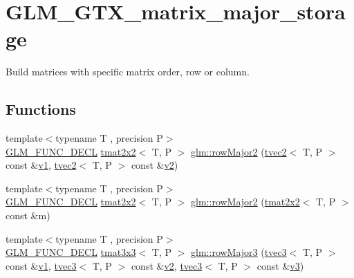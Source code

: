 \hypertarget{group__gtx__matrix__major__storage}{}\section{G\+L\+M\+\_\+\+G\+T\+X\+\_\+matrix\+\_\+major\+\_\+storage}
\label{group__gtx__matrix__major__storage}


Build matrices with specific matrix order, row or column.  


\subsection*{Functions}
\begin{DoxyCompactItemize}
\item 
{\footnotesize template$<$typename T , precision P$>$ }\\\mbox{\hyperlink{setup_8hpp_ab2d052de21a70539923e9bcbf6e83a51}{G\+L\+M\+\_\+\+F\+U\+N\+C\+\_\+\+D\+E\+CL}} \mbox{\hyperlink{structglm_1_1tmat2x2}{tmat2x2}}$<$ T, P $>$ \mbox{\hyperlink{group__gtx__matrix__major__storage_ga0c7f4d56a85865f0002127119ab7d551}{glm\+::row\+Major2}} (\mbox{\hyperlink{structglm_1_1tvec2}{tvec2}}$<$ T, P $>$ const \&\mbox{\hyperlink{glad_8h_a0779c3b73f9aa3a0ac5b0139b5d291d9}{v1}}, \mbox{\hyperlink{structglm_1_1tvec2}{tvec2}}$<$ T, P $>$ const \&\mbox{\hyperlink{glad_8h_a9a09a1837922b2b806f4589096a52049}{v2}})
\item 
{\footnotesize template$<$typename T , precision P$>$ }\\\mbox{\hyperlink{setup_8hpp_ab2d052de21a70539923e9bcbf6e83a51}{G\+L\+M\+\_\+\+F\+U\+N\+C\+\_\+\+D\+E\+CL}} \mbox{\hyperlink{structglm_1_1tmat2x2}{tmat2x2}}$<$ T, P $>$ \mbox{\hyperlink{group__gtx__matrix__major__storage_ga42a006aa66198452bd3c89415f892196}{glm\+::row\+Major2}} (\mbox{\hyperlink{structglm_1_1tmat2x2}{tmat2x2}}$<$ T, P $>$ const \&m)
\item 
{\footnotesize template$<$typename T , precision P$>$ }\\\mbox{\hyperlink{setup_8hpp_ab2d052de21a70539923e9bcbf6e83a51}{G\+L\+M\+\_\+\+F\+U\+N\+C\+\_\+\+D\+E\+CL}} \mbox{\hyperlink{structglm_1_1tmat3x3}{tmat3x3}}$<$ T, P $>$ \mbox{\hyperlink{group__gtx__matrix__major__storage_gaba4de9afc4e65ec8ea0403e7cba3fb9f}{glm\+::row\+Major3}} (\mbox{\hyperlink{structglm_1_1tvec3}{tvec3}}$<$ T, P $>$ const \&\mbox{\hyperlink{glad_8h_a0779c3b73f9aa3a0ac5b0139b5d291d9}{v1}}, \mbox{\hyperlink{structglm_1_1tvec3}{tvec3}}$<$ T, P $>$ const \&\mbox{\hyperlink{glad_8h_a9a09a1837922b2b806f4589096a52049}{v2}}, \mbox{\hyperlink{structglm_1_1tvec3}{tvec3}}$<$ T, P $>$ const \&\mbox{\hyperlink{glad_8h_acc806b31cbf466ceba6555983d8b814d}{v3}})

\end{DoxyCompactItemize}
